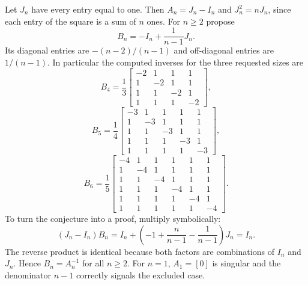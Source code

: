 Let $J_n$ have every entry equal to one. Then $A_n=J_n-I_n$ and
$J_n^2=nJ_n$, since each entry of the square is a sum of $n$ ones.
For $n\ge2$ propose
\[
 B_n=-I_n+\frac1{n-1}J_n.
\]
Its diagonal entries are $-(n-2)/(n-1)$ and off-diagonal entries are
$1/(n-1)$. In particular the computed inverses for the three requested sizes are
\[
 B_4=\frac13\begin{bmatrix}-2&1&1&1\\1&-2&1&1\\1&1&-2&1\\1&1&1&-2\end{bmatrix},
\]
\[
 B_5=\frac14\begin{bmatrix}-3&1&1&1&1\\1&-3&1&1&1\\1&1&-3&1&1\\1&1&1&-3&1\\1&1&1&1&-3\end{bmatrix},
\]
\[
 B_6=\frac15\begin{bmatrix}-4&1&1&1&1&1\\1&-4&1&1&1&1\\1&1&-4&1&1&1\\1&1&1&-4&1&1\\1&1&1&1&-4&1\\1&1&1&1&1&-4\end{bmatrix}.
\]
To turn the conjecture into a proof, multiply symbolically:
\[
 (J_n-I_n)B_n
 =I_n+\left(-1+\frac{n}{n-1}-\frac1{n-1}\right)J_n=I_n.
\]
The reverse product is identical because both factors are combinations of
$I_n$ and $J_n$. Hence $B_n=A_n^{-1}$ for all $n\ge2$.
For $n=1$, $A_1=[0]$ is singular and the denominator $n-1$ correctly
signals the excluded case.
